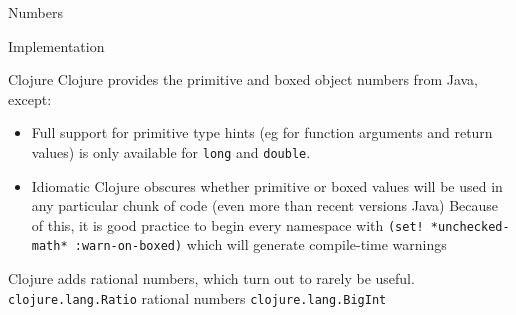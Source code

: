 \begin{plSection}{Numbers}
\begin{plSection}{Implementation}
\begin{plSection}{Clojure}
Clojure provides the primitive and boxed object numbers from Java,
except:
\begin{itemize}
  \item Full support for primitive type hints (eg for function arguments and
  return values) is only available for \lstinline|long| and \lstinline|double|.
  \item Idiomatic Clojure obscures whether primitive or boxed values will be
  used in any particular chunk of code (even more than recent versions  Java)
  Because of this, it is good practice to begin every namespace with
  \lstinline|(set! *unchecked-math* :warn-on-boxed)|
which will generate compile-time warnings
\end{itemize}

Clojure adds rational numbers, which turn out to rarely be useful.\\
\lstinline|clojure.lang.Ratio| rational numbers
\lstinline|clojure.lang.BigInt|~\cite[p.~428]{EmerickCarperGrand:2012:ClojureProgramming}

\end{plSection}%
\end{plSection}%
\end{plSection}%

